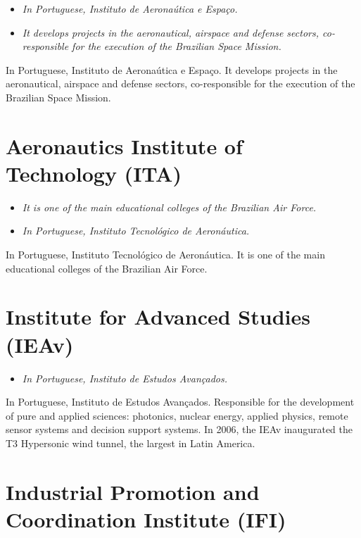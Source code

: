 \begin{itemize}
\item
  \emph{In Portuguese, Instituto de Aeronaútica e Espaço.}
\item
  \emph{It develops projects in the aeronautical, airspace and defense
  sectors, co-responsible for the execution of the Brazilian Space
  Mission.}
\end{itemize}

In Portuguese, Instituto de Aeronaútica e Espaço. It develops projects
in the aeronautical, airspace and defense sectors, co-responsible for
the execution of the Brazilian Space Mission.

\section{Aeronautics Institute of Technology
(ITA)}\label{aeronautics-institute-of-technology-ita}

\begin{itemize}
\item
  \emph{It is one of the main educational colleges of the Brazilian Air
  Force.}
\item
  \emph{In Portuguese, Instituto Tecnológico de Aeronáutica.}
\end{itemize}

In Portuguese, Instituto Tecnológico de Aeronáutica. It is one of the
main educational colleges of the Brazilian Air Force.

\section{Institute for Advanced Studies
(IEAv)}\label{institute-for-advanced-studies-ieav}

\begin{itemize}
\item
  \emph{In Portuguese, Instituto de Estudos Avançados.}
\end{itemize}

In Portuguese, Instituto de Estudos Avançados. Responsible for the
development of pure and applied sciences: photonics, nuclear energy,
applied physics, remote sensor systems and decision support systems. In
2006, the IEAv inaugurated the T3 Hypersonic wind tunnel, the largest in
Latin America.

\section{Industrial Promotion and Coordination Institute
(IFI)}\label{industrial-promotion-and-coordination-institute-ifi}

